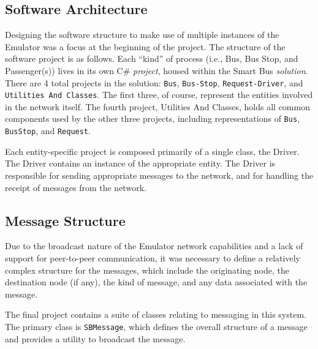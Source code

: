 \documentclass[runningheads]{llncs}
\begin{document}
\subsection{Software Architecture}
Designing the software structure to make use of multiple instances of the Emulator was a focus at the beginning of the project. The structure of the software project is as follows. Each ``kind'' of process (i.e., Bus, Bus Stop, and Passenger(s)) lives in its own C\# \emph{project}, housed within the Smart Bus \emph{solution}. There are 4 total projects in the solution: \lstinline{Bus}, \lstinline{Bus-Stop}, \lstinline{Request-Driver}, and \lstinline{Utilities And Classes}. The first three, of course, represent the entities involved in the network itself. The fourth project, Utilities And Classes, holds all common components used by the other three projects, including representations of \lstinline{Bus}, \lstinline{BusStop}, and \lstinline{Request}.

Each entity-specific project is composed primarily of a single class, the Driver. The Driver contains an instance of the appropriate entity. The Driver is responsible for sending appropriate messages to the network, and for handling the receipt of messages from the network.

\subsection{Message Structure}
Due to the broadcast nature of the Emulator network capabilities and a lack of support for peer-to-peer communication, it was necessary to define a relatively complex structure for the messages, which include the originating node, the destination node (if any), the kind of message, and any data associated with the message.

The final project contains a suite of classes relating to messaging in this system. The primary class is \lstinline{SBMessage}, which defines the overall structure of a message and provides a utility to broadcast the message.
\end{document}
